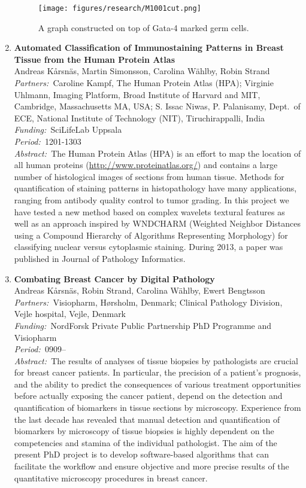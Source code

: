 \documentclass[10pt, a4paper]{article}
\newcommand{\aabstract}[1]{\emph{Abstract:~}#1}
\newcommand{\ffunding}[1]{\emph{Funding:~}#1\\}
\newcommand{\ppartners}[1]{\emph{Partners:~}#1\\}
\newcommand{\pperiod}[1]{\emph{Period:~}#1\\}
\begin{document}
\begin{enumerate}
\begin{figure}[h]
\centering %
\texttt{[image: figures/research/M1001cut.png]}
 \caption{A graph constructed on top of Gata-4 marked germ cells.}
 \label{testis}
 \end{figure}


\item 
\textbf{Automated Classification of Immunostaining Patterns in Breast Tissue from the Human Protein Atlas}\\
Andreas K{\aa}rsn\"{a}s, Martin Simonsson, Carolina W\"{a}hlby, Robin Strand\\
\ppartners{Caroline Kampf, The Human Protein Atlas (HPA); Virginie Uhlmann,  Imaging Platform, Broad Institute of Harvard and MIT, Cambridge, Massachusetts MA, USA; S. Issac Niwas, P. Palanisamy, Dept.~of ECE, National Institute of Technology (NIT), Tiruchirappalli, India}
\ffunding{SciLifeLab Uppsala}
\pperiod{1201-1303}
\aabstract{The Human Protein Atlas (HPA) is an effort to map the location of all human proteins (\url{http://www.proteinatlas.org/}) and contains a large number of histological images of sections from human tissue. Methods for quantification of staining patterns in histopathology have many applications, ranging from antibody quality control to tumor grading. In this project we have tested a new method based on complex wavelets textural features as well as an approach inspired by WNDCHARM (Weighted Neighbor Distances using a Compound Hierarchy of Algorithms Representing Morphology) for classifying nuclear versus cytoplasmic staining. During 2013, a paper was published in Journal of Pathology Informatics.}


\item %
\label{proj:CombatingCancer}
\textbf{Combating Breast Cancer by Digital Pathology}\\
Andreas K{\aa}rsn\"{a}s, Robin Strand, Carolina W\"{a}hlby, Ewert Bengtsson\\
\ppartners{Visiopharm, H{\o}rsholm, Denmark; Clinical Pathology Division, Vejle hospital, Vejle, Denmark}
\ffunding{NordForsk Private Public Partnership PhD Programme and Visiopharm}
\pperiod{0909--}
\aabstract{The results of analyses of tissue biopsies by pathologists are crucial for breast cancer patients. In particular, the precision of a patient's prognosis, and the ability to predict the consequences of various treatment opportunities before actually exposing the cancer patient, depend on the detection and quantification of biomarkers in tissue sections by microscopy. Experience from the last decade has revealed that manual detection and quantification of biomarkers by microscopy of tissue biopsies is highly dependent on the competencies and stamina of the individual pathologist. The aim of the present PhD project is to develop software-based algorithms that can facilitate the workflow and ensure objective and more precise results of the quantitative microscopy procedures in breast cancer.

}
\end{enumerate}
\end{document}
